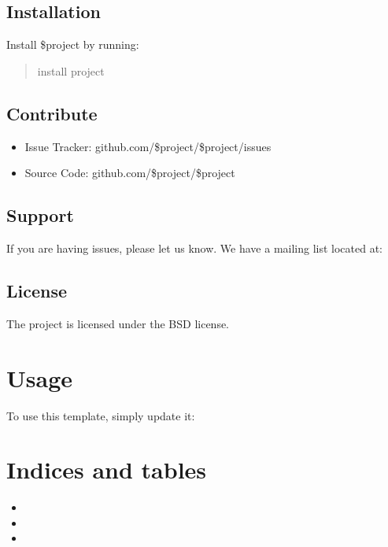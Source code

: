 \documentclass[letterpaper,10pt,english]{sphinxmanual}
\begin{document}
\section{Installation}
\label{\detokenize{readme:installation}}
Install \$project by running:
\begin{quote}

install project
\end{quote}


\section{Contribute}
\label{\detokenize{readme:contribute}}\begin{itemize}
\item {} 
Issue Tracker: github.com/\$project/\$project/issues

\item {} 
Source Code: github.com/\$project/\$project

\end{itemize}


\section{Support}
\label{\detokenize{readme:support}}
If you are having issues, please let us know.
We have a mailing list located at: 


\section{License}
\label{\detokenize{readme:license}}
The project is licensed under the BSD license.


\chapter{Usage}
\label{\detokenize{usage:usage}}\label{\detokenize{usage::doc}}
To use this template, simply update it:

\begin{sphinxVerbatim}[commandchars=\\\{\}]
 
\end{sphinxVerbatim}


\chapter{Indices and tables}
\label{\detokenize{index:indices-and-tables}}\begin{itemize}
\item {} 

\item {} 

\item {} 

\end{itemize}



\renewcommand{\indexname}{Index}
\printindex
\end{document}
